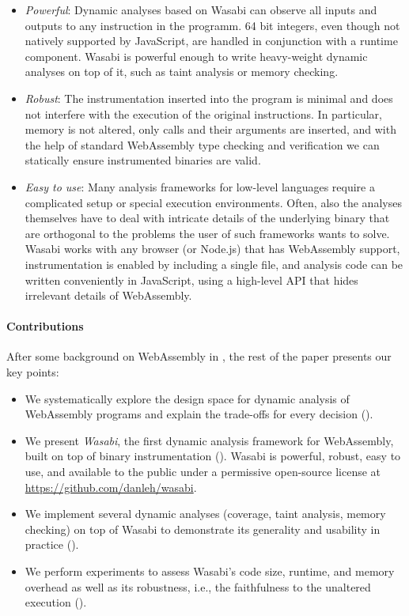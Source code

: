 \documentclass[sigplan,review,anonymous]{acmart}\settopmatter{printfolios=true,printccs=false,printacmref=false}
\newcommand{\name}{Wasabi}
\begin{document}
\begin{itemize}[leftmargin=\parindent, label=$\circ$]
	\item \emph{Powerful}: Dynamic analyses based on Wasabi can observe all inputs and outputs to any instruction in the programm. 64 bit integers, even though not natively supported by JavaScript, are handled in conjunction with a runtime component. Wasabi is powerful enough to write heavy-weight dynamic analyses on top of it, such as taint analysis or memory checking.
	
	\item \emph{Robust}: The instrumentation inserted into the program is minimal and does not interfere with the execution of the original instructions. In particular, memory is not altered, only calls and their arguments are inserted, and with the help of standard WebAssembly type checking and verification we can statically ensure instrumented binaries are valid.
	
	\item \emph{Easy to use}: Many analysis frameworks for low-level languages require a complicated setup or special execution environments. Often, also the analyses themselves have to deal with intricate details of the underlying binary that are orthogonal to the problems the user of such frameworks wants to solve. Wasabi works with any browser (or Node.js) that has WebAssembly support, instrumentation is enabled by including a single file, and analysis code can be written conveniently in JavaScript, using a high-level API that hides irrelevant details of WebAssembly.	
\end{itemize}

\paragraph{Contributions} After some background on WebAssembly in , the rest of the paper presents our key points:

\begin{itemize}[leftmargin=\parindent]
	\item We systematically explore the design space for dynamic analysis of WebAssembly programs and explain the trade-offs for every decision ().
	\item We present \emph{\name}, the first dynamic analysis framework for WebAssembly, built on top of binary instrumentation (). Wasabi is powerful, robust, easy to use, and available to the public under a permissive open-source license at \url{https://github.com/danleh/wasabi}.
	\item We implement several dynamic analyses (coverage, taint analysis, memory checking) on top of Wasabi to demonstrate its generality and usability in practice ().
	\item We perform experiments to assess Wasabi's code size, runtime, and memory overhead as well as its robustness, i.e., the faithfulness to the unaltered execution ().
\end{itemize}
\end{document}
